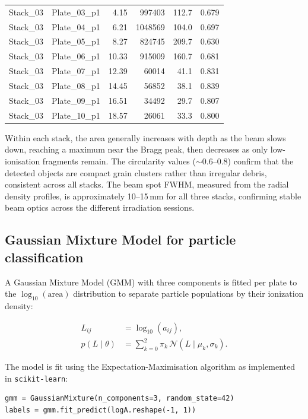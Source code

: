 \documentclass[12pt,a4paper]{article}
\begin{document}
\begin{longtable}{llrrrr}
Stack\_03 & Plate\_03\_p1 & 4.15 & 997403 & 112.7 & 0.679 \\
Stack\_03 & Plate\_04\_p1 & 6.21 & 1048569 & 104.0 & 0.697 \\
Stack\_03 & Plate\_05\_p1 & 8.27 & 824745 & 209.7 & 0.630 \\
Stack\_03 & Plate\_06\_p1 & 10.33 & 915009 & 160.7 & 0.681 \\
Stack\_03 & Plate\_07\_p1 & 12.39 & 60014 & 41.1 & 0.831 \\
Stack\_03 & Plate\_08\_p1 & 14.45 & 56852 & 38.1 & 0.839 \\
Stack\_03 & Plate\_09\_p1 & 16.51 & 34492 & 29.7 & 0.807 \\
Stack\_03 & Plate\_10\_p1 & 18.57 & 26061 & 33.3 & 0.800 \\
\end{longtable}

Within each
stack, the area generally increases with depth as the beam slows down,
reaching a maximum near the Bragg peak, then decreases as only
low-ionisation fragments remain. The circularity values ($\sim$0.6--0.8) confirm that
the detected objects are compact grain clusters rather than irregular
debris, consistent across all stacks. The beam spot FWHM, measured
from the radial density profiles, is approximately 10--15\,mm for all
three stacks, confirming stable beam optics across the different
irradiation sessions.

\subsection{Gaussian Mixture Model for particle classification}
\label{sec:gmm}

A Gaussian Mixture Model (GMM) with three components is fitted per
plate to the $\log_{10}(\text{area})$ distribution to separate
particle populations by their ionization density:

\begin{align}
L_{ij} &= \log_{10}(a_{ij}), \label{eq:logarea}\\
p(L\mid\theta) &= \sum_{k=0}^{2} \pi_k \,
\mathcal{N}(L\mid\mu_k,\sigma_k). \label{eq:gmm}
\end{align}

The model is fit using the Expectation-Maximisation algorithm as
implemented in \texttt{scikit-learn}:

\begin{verbatim}
gmm = GaussianMixture(n_components=3, random_state=42)
labels = gmm.fit_predict(logA.reshape(-1, 1))
\end{verbatim}
\end{document}

